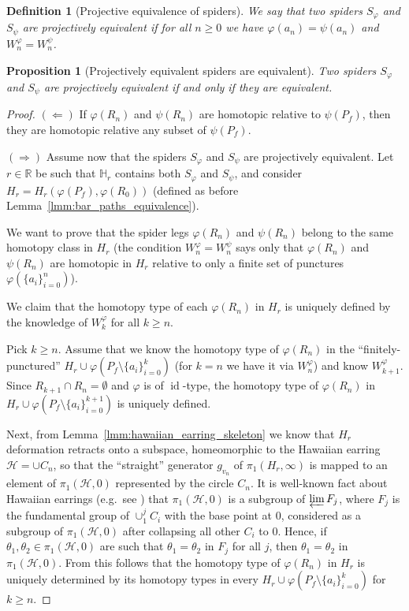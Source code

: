 \documentclass[10pt,reqno,a4paper]{amsart}
\numberwithin{figure}{section}
\numberwithin{equation}{section}
\newtheorem{defn}[thm]{Definition}
\newtheorem{prp}[thm]{Proposition}
\newcommand{\idt}{of $\id$-type}
\newcommand{\id}{\operatorname{id}}
\begin{document}
\begin{defn}[Projective equivalence of spiders]
	\label{defn:proj_equiv}
	We say that two spiders $S_\varphi$ and $S_\psi$ are projectively equivalent if for all $n\geq 0$ we have $\varphi(a_n)=\psi(a_n)$ and $W_n^\varphi=W_n^\psi$.
\end{defn}

\begin{prp}[Projectively equivalent spiders are equivalent]
	\label{prp:proj_spiders_define_teich_point}
	Two spiders $S_\varphi$ and $S_\psi$ are \emph{projectively equivalent} if and only if they are equivalent.
\end{prp}
\begin{proof}
	$(\Leftarrow)$  If $\varphi(R_n)$ and $\psi(R_n)$ are homotopic relative to $\psi(P_f)$, then they are homotopic relative any subset of $\psi(P_f)$. 
	
	$(\Rightarrow)$ Assume now that the spiders $S_\varphi$ and $S_\psi$ are projectively equivalent. Let $r\in\mathbb{R}$ be such that $\mathbb{H}_r$ contains both $S_\varphi$ and $S_\psi$, and consider $H_r=H_r(\varphi(P_f), \varphi(R_0))$ (defined as before Lemma~\ref{lmm:bar_paths_equivalence}).
	
	We want to prove that the spider legs $\varphi(R_n)$ and $\psi(R_n)$ belong to the same homotopy class in $H_r$ (the condition $W_n^{\varphi}=W_n^\psi$ says only that $\varphi(R_n)$ and $\psi(R_n)$ are homotopic in $H_r$ relative to only a finite set of punctures $\varphi(\{a_i\}_{i=0}^n)$).
	
	We claim that the homotopy type of each $\varphi(R_n)$ in $H_r$ is uniquely defined by the knowledge of $W_k^\varphi$ for all $k\geq n$. 
	
	Pick $k\geq n$. Assume that we know the homotopy type of $\varphi(R_n)$ in the ``finitely-punctured'' $H_r\cup \varphi(P_f\setminus\{a_i\}_{i=0}^k)$ (for $k=n$ we have it via $W_n^\varphi$) and know $W_{k+1}^\varphi$. Since $R_{k+1}\cap R_n=\emptyset$ and $\varphi$ is \idt, the homotopy type of $\varphi(R_n)$ in $H_r\cup \varphi(P_f\setminus\{a_i\}_{i=0}^{k+1})$ is uniquely defined.
	
	Next, from Lemma~\ref{lmm:hawaiian_earring_skeleton} we know that $H_r$ deformation retracts onto a subspace, homeomorphic to the Hawaiian earring $\mathcal{H}=\cup C_n$, so that the ``straight'' generator $g_{v_n}$ of $\pi_1(H_r,\infty)$ is mapped to an element of $\pi_1(\mathcal{H},0)$ represented by the circle $C_n$. It is well-known fact about Hawaiian earrings (e.g.\ see \cite{hawaiian}) that $\pi_1(\mathcal{H},0)$ is a subgroup of $\varprojlim F_j$, where $F_j$ is the fundamental group of $\cup_1^j C_i$ with the base point at $0$, considered as a subgroup of $\pi_1(\mathcal{H},0)$ after collapsing all other $C_i$ to $0$. Hence, if $\theta_1,\theta_2\in\pi_1(\mathcal{H},0)$ are such that $\theta_1=\theta_2$ in $F_j$ for all $j$, then $\theta_1=\theta_2$ in $\pi_1(\mathcal{H},0)$. From this follows that the homotopy type of $\varphi(R_n)$ in $H_r$ is uniquely determined by its homotopy types in every $H_r\cup \varphi(P_f\setminus\{a_i\}_{i=0}^k)$ for $k\geq n$.	
\end{proof}
\end{document}

